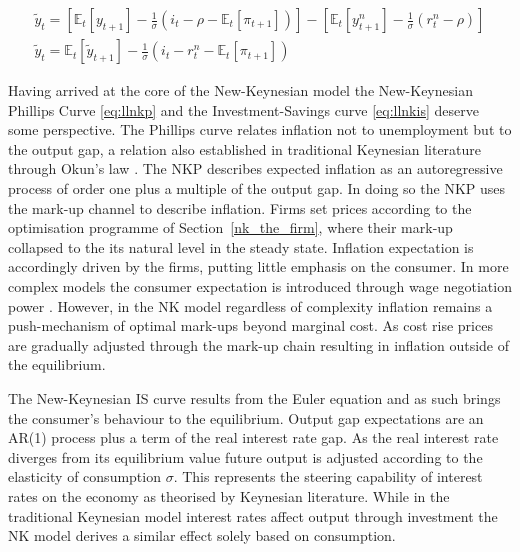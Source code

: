 \documentclass[12pt,a4paper,english]{article} %
\newcommand{\E}{\mathbb{E}} %
\begin{document}
	\begin{equation}  \label{eq:llnkis}
		\begin{aligned}
			\tilde{y}_t = 
			\left[
			\E_t[y_{t+1}] - \frac{1}{\sigma} (i_t - \rho - \E_t[\pi_{t+1}])
			\right]
			-
			\left[
			\E_t[y_{t+1}^n] - \frac{1}{\sigma} (r_t^n - \rho)
			\right] \\
			\tilde{y}_t = \E_t[\tilde{y}_{t+1}] - \frac{1}{\sigma} (i_t - r_t^n - \E_t[\pi_{t+1}])
		\end{aligned}
	\end{equation}
	
	Having arrived at the core of the New-Keynesian model the New-Keynesian Phillips Curve \eqref{eq:llnkp} and the Investment-Savings curve \eqref{eq:llnkis} deserve some perspective. 
	The Phillips curve relates inflation not to unemployment but to the output gap, a relation also established in traditional Keynesian literature through Okun's law \cite{schumpeter_general_1936}. The NKP describes expected inflation as an autoregressive process of order one plus a multiple of the output gap. In doing so the \ac{NKP} uses the mark-up channel to describe inflation. Firms set prices according to the optimisation programme of Section~\ref{nk_the_firm}, where their mark-up collapsed to the its natural level in the steady state. Inflation expectation is accordingly driven by the firms, putting little emphasis on the consumer. In more complex models the consumer expectation is introduced through wage negotiation power \cite{smets_shocks_2007}. However, in the NK model regardless of complexity inflation remains a push-mechanism of optimal mark-ups beyond marginal cost. As cost rise prices are gradually adjusted through the mark-up chain resulting in inflation outside of the equilibrium.
	
	The New-Keynesian \ac{IS} curve results from the Euler equation and as such brings the consumer's behaviour to the equilibrium. Output gap expectations are an AR(1) process plus a term of the real interest rate gap. As the real interest rate diverges from its equilibrium value future output is adjusted according to the elasticity of consumption $\sigma$. This represents the steering capability of interest rates on the economy as theorised by Keynesian literature. While in the traditional Keynesian model interest rates affect output through investment the NK model derives a similar effect solely based on consumption. 
\end{document}
